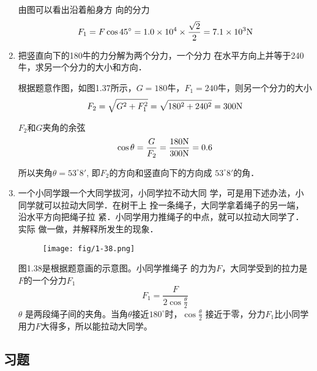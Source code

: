 \begin{enumerate}
\begin{figure}[htp]
\begin{minipage}[t]{0.48\textwidth}
    \caption{}
    \end{minipage}
    \end{figure}

\begin{solution}
    由图可以看出沿着船身方
向的分力
\[F_1=F\cos45^{\circ}=1.0\times 10^4\times \frac{\sqrt{2}}{2}=7.1\times 10^3{\rm N}\]
\end{solution}

\item 把竖直向下的180牛的力分解为两个分力，一个分力
在水平方向上并等于240牛，求另一个分力的大小和方向．

 
\begin{solution}
    根据题意作图，如图1.37所示，$G=180$牛，$F_1=240$牛，则另一个分力的大小
 \[   F_2=\sqrt{G^2+F_1^2}=\sqrt{180^2+240^2}=300{\rm N}\]

 $F_2$和$G$夹角的余弦
 \[\cos\theta=\frac{G}{F_2}=\frac{180{\rm N}}{300{\rm N}}=0.6\]

 所以夹角$\theta=53^{\circ}8'$, 即$F_2$的方向和竖直向下的方向成
$53^{\circ}8'$的角．
\end{solution}
\item 一个小同学跟一个大同学拔河，小同学拉不动大同
学，可是用下述办法，小同学就可以拉动大同学．在树干上
拴一条绳子，大同学拿着绳子的另一端，沿水平方向把绳子拉
紧．小同学用力推绳子的中点，就可以拉动大同学了．实际
做一做，并解释所发生的现象．

\begin{figure}[htp]
    \centering
\texttt{[image: fig/1-38.png]}
    \caption{}
\end{figure}

 \begin{solution}
    图1.38是根据题意画的示意图。小同学推绳子
    的力为$F$，大同学受到的拉力是$F$的一个分力$F_1$
\[F_1=\frac{F}{2\cos\frac{\theta}{2}}\]
 $\theta$   是两段绳子间的夹角。当角$\theta$接近$180^{\circ}$时，$\cos\frac{\theta}{2}$
    接近于零，分力$F_1$比小同学用力$F$大得多，所以能拉动大同学。
\end{solution}
\end{enumerate}

\subsection{习题}

